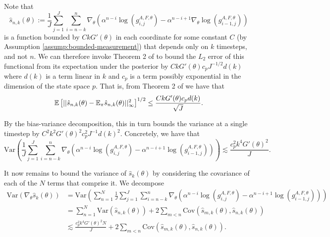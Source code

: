 \documentclass{article}
\begin{document}
Note that $$\hat s_{n,k}(\theta) := \frac{1}{J}\sum_{j=1}^J\sum_{i=n-k}^n \nabla_\theta\left(\alpha^{n-i} \log\left(g_{i,j}^{A,F,\theta}\right)- \alpha^{n-i+1} \nabla_\theta \log\left(g_{i-1,j}^{A,F,\theta}\right)\right)$$ is a function bounded by $CkG'(\theta)$ in each coordinate for some constant $C$ (by Assumption \ref{assump:bounded-measurement}) that depends only on $k$ timesteps, and not $n$. We can therefore invoke Theorem 2 of \cite{delMoral03} to bound the $L_2$ error of this functional from its expectation under the posterior by $CkG'(\theta)c_pJ^{-1/2}d(k)$ where $d(k)$ is a term linear in $k$ and $c_p$ is a term possibly exponential in the dimension of the state space $p$. That is, from Theorem 2 of \cite{delMoral03} we have that
$$\mathbb{E}\left[||\hat s_{n,k}(\theta) - \mathbb{E}_{\pi}\hat s_{n,k}(\theta)||_\infty^2\right]^{1/2} \leq \frac{CkG'(\theta)c_pd(k)}{\sqrt{J}}.$$


By the bias-variance decomposition, this in turn bounds the variance at a single timestep by $C^2k^2G'(\theta)^2c_p^2J^{-1}d(k)^2$. Concretely, we have that
$$\text{Var}\left(\frac{1}{J}\sum_{j=1}^J\sum_{i=n-k}^n \nabla_\theta\left(\alpha^{n-i} \log\left(g_{i,j}^{A,F,\theta}\right)- \alpha^{n-i+1} \log\left(g_{i-1,j}^{A,F,\theta}\right)\right)\right) \lesssim \frac{c_p^2k^4G'(\theta)^2}{J}.$$

It now remains to bound the variance of $\hat s_k(\theta)$ by considering the covariance of each of the $N$ terms that comprise it. We decompose
\begin{align*}
    \text{Var}(\nabla_\theta \hat s_k(\theta)) &= \text{Var}\left(\sum_{n=1}^N \frac{1}{J}\sum_{j=1}^J\sum_{i=n-k}^n \nabla_\theta\left(\alpha^{n-i} \log\left(g_{i,j}^{A,F,\theta}\right)- \alpha^{n-i+1} \log\left(g_{i-1,j}^{A,F,\theta}\right)\right)\right) \\
    &= \sum_{n=1}^N\text{Var}\left(\hat s_{n,k}(\theta)\right)+ 2\sum_{m<n}\text{Cov}\left(\hat s_{m,k}(\theta), \hat s_{n,k}(\theta)\right) \\
    &\lesssim \frac{c_p^2k^4G'(\theta)^2N}{J} + 2\sum_{m<n}\text{Cov}\left(\hat s_{m,k}(\theta), \hat s_{n,k}(\theta)\right).
\end{align*}
\end{document}
